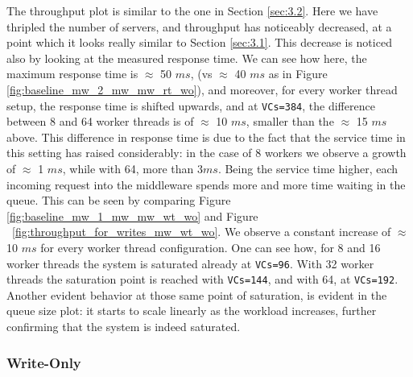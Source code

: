 \documentclass[11pt,a4paper]{article}
\begin{document}
The throughput plot is similar to the one in Section \ref{sec:3.2}. Here we have thripled the number of servers, and throughput has noticeably decreased, at a point which it looks really similar to Section \ref{sec:3.1}. This decrease is noticed also by looking at the measured response time. We can see how here, the maximum response time is $\approx$ 50 $ms$, (vs $\approx$ 40 $ms$ as in Figure \ref{fig:baseline_mw_2_mw_mw_rt_wo}), and moreover, for every worker thread setup, the response time is shifted upwards, and at \texttt{VCs=384}, the difference between 8 and 64 worker threads is of $\approx$ 10 $ms$, smaller than the $\approx$ 15 $ms$ above.
This difference in response time is due to the fact that the service time in this setting has raised considerably: in the case of 8 workers we observe a growth of $\approx$ 1 $ms$, while with 64, more than $3ms$. 
Being the service time higher, each incoming request into the middleware spends more and more time waiting in the queue. This can be seen by comparing Figure \ref{fig:baseline_mw_1_mw_mw_wt_wo} and Figure ~\ref{fig:throughput_for_writes_mw_wt_wo}. We observe a constant increase of $\approx$ 10 $ms$ for every worker thread configuration. 
One can see how, for 8 and 16 worker threads the system is saturated already at \texttt{VCs=96}. With 32 worker threads the saturation point is reached with \texttt{VCs=144}, and with 64, at \texttt{VCs=192}.
Another evident behavior at those same point of saturation, is evident in the queue size plot: it starts to scale linearly as the workload increases, further confirming that the system is indeed saturated.

\subsubsection*{Write-Only}
\end{document}
